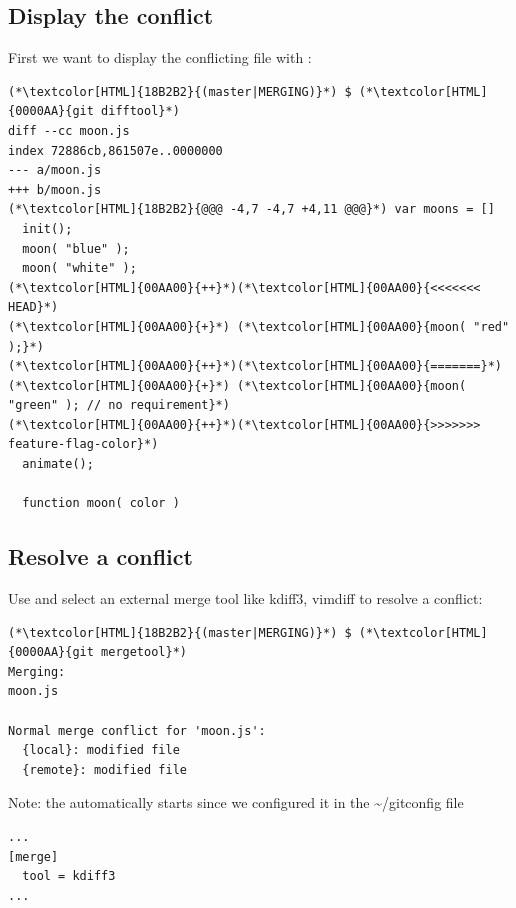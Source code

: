 \subsection{Display the conflict}
\begin{frame}[fragile]
    \subslidetitle

  First we want to display the conflicting file with :
  \begin{lstlisting}
(*\textcolor[HTML]{18B2B2}{(master|MERGING)}*) $ (*\textcolor[HTML]{0000AA}{git difftool}*)
diff --cc moon.js
index 72886cb,861507e..0000000
--- a/moon.js
+++ b/moon.js
(*\textcolor[HTML]{18B2B2}{@@@ -4,7 -4,7 +4,11 @@@}*) var moons = []
  init();
  moon( "blue" );
  moon( "white" );
(*\textcolor[HTML]{00AA00}{++}*)(*\textcolor[HTML]{00AA00}{<<<<<<< HEAD}*)
(*\textcolor[HTML]{00AA00}{+}*) (*\textcolor[HTML]{00AA00}{moon( "red" );}*)
(*\textcolor[HTML]{00AA00}{++}*)(*\textcolor[HTML]{00AA00}{=======}*)
(*\textcolor[HTML]{00AA00}{+}*) (*\textcolor[HTML]{00AA00}{moon( "green" ); // no requirement}*)
(*\textcolor[HTML]{00AA00}{++}*)(*\textcolor[HTML]{00AA00}{>>>>>>> feature-flag-color}*)
  animate();
  
  function moon( color )
\end{lstlisting}
\end{frame}

\subsection{Resolve a conflict}
\begin{frame}[fragile]
    \subslidetitle
  Use  and select an external merge tool like kdiff3, vimdiff to resolve a conflict:

  \begin{lstlisting}
(*\textcolor[HTML]{18B2B2}{(master|MERGING)}*) $ (*\textcolor[HTML]{0000AA}{git mergetool}*)
Merging:
moon.js

Normal merge conflict for 'moon.js':
  {local}: modified file
  {remote}: modified file
\end{lstlisting}

  Note: the  automatically starts since we configured it in the \textasciitilde/gitconfig file
  \begin{lstlisting}
...
[merge]
  tool = kdiff3
...
\end{lstlisting}
\end{frame}

